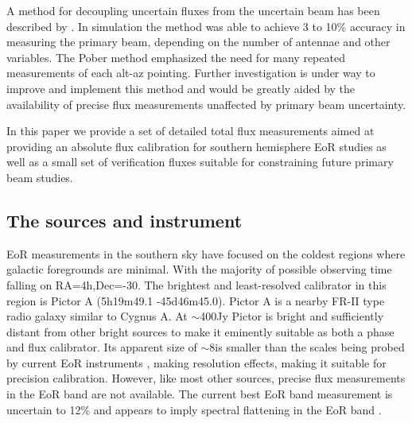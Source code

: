 \documentclass[preprint]{aastex}
\begin{document}
A method for decoupling uncertain fluxes from the uncertain beam has been
described by \citet{Pober:2012p8800}. In simulation the method was able to
achieve 3 to 10\% accuracy in measuring the primary beam, depending on the
number of antennae and other variables. The Pober method emphasized the need
for many repeated measurements of each alt-az pointing. Further investigation
is under way to improve and implement this method and would be greatly aided by
the availability of precise flux measurements unaffected by primary beam
uncertainty. 

In this paper we provide a set of detailed total flux measurements aimed at providing
an absolute flux calibration for southern hemisphere EoR studies as well as a
small set of verification fluxes suitable for constraining future primary beam studies.

\subsection{The sources and instrument}
EoR measurements in the southern sky have focused on the coldest regions where
galactic foregrounds are minimal. With the majority of possible observing time falling on 
RA=4h,Dec=-30. The brightest and least-resolved calibrator in this region is Pictor A 
(5h19m49.1 -45d46m45.0). Pictor A is a nearby FR-II type radio galaxy 
 similar to Cygnus A.  At $\sim$400Jy Pictor is bright and sufficiently distant from other 
bright sources to make it eminently suitable as both a phase and flux calibrator. Its apparent
size of $\sim$8\arcmin is smaller than the scales being probed by current EoR instruments , 
making resolution effects, making it suitable for precision calibration.  However, 
like most other sources, precise flux measurements in the EoR band are not available.
The current best EoR band measurement
is uncertain to 12\% and appears to imply spectral flattening in the EoR band
\citep{Perley:1997p9312}. 
 
\end{document}
